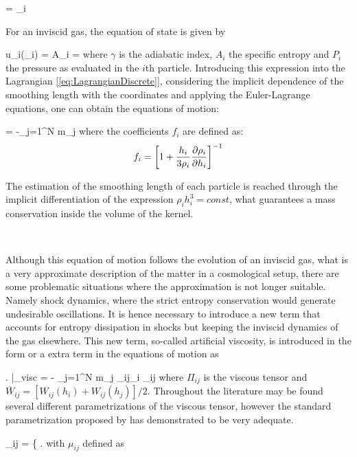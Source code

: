 \documentclass[a4,useAMS,usenatbib,usegraphicx,12pt]{article}
\begin{document}
{  = \sum_i  }

For an inviscid gas, the equation of state is given by

{ u_i(\rho_i) = A_i = 
 }
where $\gamma$ is the adiabatic index, $A_i$ the specific entropy and $P_i$ the
pressure as evaluated in the $i$th particle. Introducing this expression into
the Lagrangian [\ref{eq:LagrangianDiscrete}], considering the implicit dependence 
of the smoothing length with the coordinates and applying the Euler-Lagrange 
equations, one can obtain the equations of motion:

{ = -\sum_{j=1}^N m_j  }
where the coefficients $f_i$ are defined as:
\[ f_i = \left[  1+\frac{h_i}{3\rho_i}\frac{\partial \rho_i}{\partial h_i}  \right]^{-1} \]

The estimation of the smoothing length of each particle is reached through the
implicit differentiation of the expression $\rho_i h_i^3 = const$, what 
guarantees a mass conservation inside the volume of the kernel.

\

Although this equation of motion follows the evolution of an inviscid gas, what
is a very approximate description of the matter in a cosmological setup, there
are some problematic situations where the approximation is not longer suitable.
Namely shock dynamics, where the strict entropy conservation would generate
undesirable oscillations. It is hence necessary to introduce a new term that 
accounts for entropy dissipation in shocks but keeping the inviscid dynamics of
the gas elsewhere. This new term, so-called artificial viscosity, is introduced 
in the form or a extra term in the equations of motion as

{ \left. \right|_{\mbox{\footnotesize visc}} =
- \sum_{j=1}^N m_j \Pi_{ij}\nabla_i _{ij} }
where $\Pi_{ij}$ is the viscous tensor and $\overline{W}_{ij} = [W_{ij}(h_i)+
W_{ij}(h_j)]/2$. Throughout the literature may be found several different 
parametrizations of the viscous tensor, however the standard parametrization
proposed by \citet{Monaghan83} has demonstrated to be very adequate.

{ \Pi_{ij} = \left\{ \right. }
with $\mu_{ij}$ defined as
\end{document}
